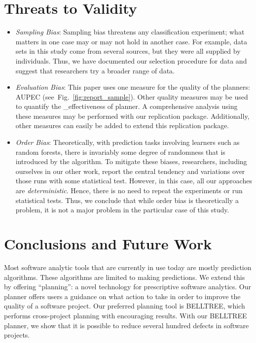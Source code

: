 \documentclass[10pt, journal, compsoc]{IEEEtran}
\newcommand{\fig}[1]{Fig.~\ref{fig:#1}}
\begin{document}
\section{Threats to Validity}
\label{sect:threats}
\begin{itemize}[leftmargin=-1pt]
\item[] \textit{Sampling Bias}: Sampling bias threatens any classification experiment;
what matters in one case may or may not hold in another case. 
For example, data sets in this study come from several sources, but they were all supplied by individuals. Thus, we have documented our selection procedure for data and suggest that researchers
try a broader range of data.
\item[] \textit{Evaluation Bias}:
This paper uses one measure for the quality of the planners: AUPEC (see~\fig{report_sample}). Other quality measures may be used to quantify the _effectiveness of planner. A comprehensive analysis using these measures may be performed with our replication package. Additionally, other measures can easily be added to extend this replication package.

\item[] \textit{Order Bias}: 
Theoretically, with prediction tasks involving learners such as random forests, there is invariably some degree of randomness that is introduced by the algorithm. To mitigate these biases, researchers, including ourselves in our other work, report the central tendency and variations over those runs with some statistical test. However, in this case, all our approaches are \textit{deterministic}. Hence, there is no need to repeat the experiments or run statistical tests. Thus, we conclude that while order bias is theoretically a problem, 
it is not a major problem in the particular case of this study.
\end{itemize}

\section{Conclusions and Future Work}
\label{sect:future}

Most software analytic tools that are currently in use today are mostly prediction algorithms. These algorithms are limited to making predictions. We extend this by offering ``planning'': a novel technology for prescriptive software analytics. Our planner offers users a guidance on what action to take in order to improve the quality of a software project. Our preferred planning tool is BELLTREE, which performs cross-project planning with encouraging results. With our BELLTREE planner, we show that it is possible to reduce several hundred defects in software projects. 
\end{document}
